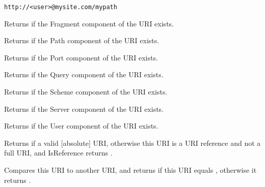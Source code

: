\tt{http://<user>@mysite.com/mypath}

\label{wxurihasfragment}


Returns \true if the Fragment component of the URI exists.

\label{wxurihaspath}


Returns \true if the Path component of the URI exists.

\label{wxurihasport}


Returns \true if the Port component of the URI exists.


\label{wxurihasquery}


Returns \true if the Query component of the URI exists.


\label{wxurihasscheme}


Returns \true if the Scheme component of the URI exists.


\label{wxurihasserver}


Returns \true if the Server component of the URI exists.


\label{wxurihasuser}


Returns \true if the User component of the URI exists.


\label{wxuriisreference}


Returns \true if a valid [absolute] URI, otherwise this URI
is a URI reference and not a full URI, and IsReference
returns \false.


\label{wxurioperatorcompare}


Compares this URI to another URI, and returns \true if 
this URI equals , otherwise it returns \false.

